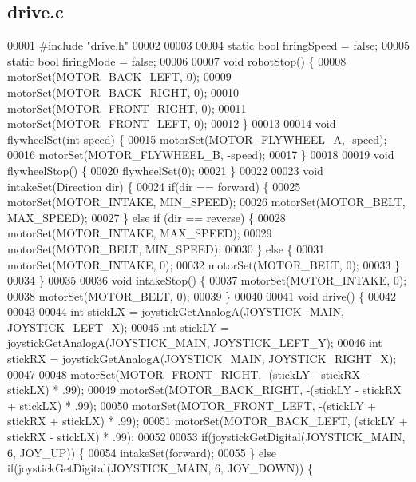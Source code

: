 \subsection{drive.\+c}
\label{drive_8c_source}

\begin{DoxyCode}
00001 \textcolor{preprocessor}{#include "drive.h"}
00002 
00003 
00004  \textcolor{keyword}{static} \textcolor{keywordtype}{bool} firingSpeed = \textcolor{keyword}{false};
00005  \textcolor{keyword}{static} \textcolor{keywordtype}{bool} firingMode = \textcolor{keyword}{false};
00006 
00007 \textcolor{keywordtype}{void} robotStop() \{
00008   motorSet(MOTOR_BACK_LEFT, 0);
00009   motorSet(MOTOR_BACK_RIGHT, 0);
00010   motorSet(MOTOR_FRONT_RIGHT, 0);
00011   motorSet(MOTOR_FRONT_LEFT, 0);
00012 \}
00013 
00014 \textcolor{keywordtype}{void} flywheelSet(\textcolor{keywordtype}{int} speed) \{
00015   motorSet(MOTOR_FLYWHEEL_A, -speed);
00016   motorSet(MOTOR_FLYWHEEL_B, -speed);
00017 \}
00018 
00019 \textcolor{keywordtype}{void} flywheelStop() \{
00020   flywheelSet(0);
00021 \}
00022 
00023 \textcolor{keywordtype}{void} intakeSet(Direction dir) \{
00024   \textcolor{keywordflow}{if}(dir == forward) \{
00025     motorSet(MOTOR_INTAKE, MIN_SPEED);
00026     motorSet(MOTOR_BELT, MAX_SPEED);
00027   \} \textcolor{keywordflow}{else} \textcolor{keywordflow}{if} (dir == reverse) \{
00028     motorSet(MOTOR_INTAKE, MAX_SPEED);
00029     motorSet(MOTOR_BELT, MIN_SPEED);
00030   \} \textcolor{keywordflow}{else} \{
00031     motorSet(MOTOR_INTAKE, 0);
00032     motorSet(MOTOR_BELT, 0);
00033   \}
00034 \}
00035 
00036 \textcolor{keywordtype}{void} intakeStop() \{
00037   motorSet(MOTOR_INTAKE, 0);
00038   motorSet(MOTOR_BELT, 0);
00039 \}
00040 
00041 \textcolor{keywordtype}{void} drive() \{
00042 
00043 
00044   \textcolor{keywordtype}{int} stickLX = joystickGetAnalogA(JOYSTICK_MAIN, JOYSTICK_LEFT_X);
00045   \textcolor{keywordtype}{int} stickLY = joystickGetAnalogA(JOYSTICK_MAIN, JOYSTICK_LEFT_Y);
00046   \textcolor{keywordtype}{int} stickRX = joystickGetAnalogA(JOYSTICK_MAIN, JOYSTICK_RIGHT_X);
00047 
00048   motorSet(MOTOR_FRONT_RIGHT, -(stickLY - stickRX - stickLX) * .99);
00049   motorSet(MOTOR_BACK_RIGHT, -(stickLY - stickRX + stickLX) * .99);
00050   motorSet(MOTOR_FRONT_LEFT, -(stickLY + stickRX + stickLX) * .99);
00051   motorSet(MOTOR_BACK_LEFT, (stickLY + stickRX - stickLX) * .99);
00052 
00053   \textcolor{keywordflow}{if}(joystickGetDigital(JOYSTICK_MAIN, 6, JOY_UP)) \{
00054     intakeSet(forward);
00055   \} \textcolor{keywordflow}{else} \textcolor{keywordflow}{if}(joystickGetDigital(JOYSTICK_MAIN, 6, JOY_DOWN)) \{

\end{DoxyCode}
